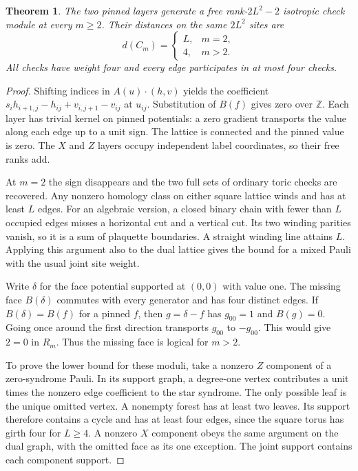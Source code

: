 \documentclass[11pt]{article}
\newtheorem{theorem}{Theorem}
\newcommand{\Z}{\mathbb Z}
\begin{document}
\begin{theorem}\label{thm:lattice}
The two pinned layers generate a free rank-$2L^2-2$ isotropic check module at every $m\ge2$. Their distances on the same $2L^2$ sites are
\[
 d(C_m)=
 \begin{cases}L,&m=2,\\4,&m>2.\end{cases}
\]
All checks have weight four and every edge participates in at most four checks.
\end{theorem}
\begin{proof}
Shifting indices in $A(u)\cdot(h,v)$ yields the coefficient
$s_i h_{i+1,j}-h_{ij}+v_{i,j+1}-v_{ij}$ at $u_{ij}$. Substitution of $B(f)$ gives zero over $\Z$. Each layer has trivial kernel on pinned potentials: a zero gradient transports the value along each edge up to a unit sign. The lattice is connected and the pinned value is zero. The $X$ and $Z$ layers occupy independent label coordinates, so their free ranks add.

At $m=2$ the sign disappears and the two full sets of ordinary toric checks are recovered. Any nonzero homology class on either square lattice winds and has at least $L$ edges. For an algebraic version, a closed binary chain with fewer than $L$ occupied edges misses a horizontal cut and a vertical cut. Its two winding parities vanish, so it is a sum of plaquette boundaries. A straight winding line attains $L$. Applying this argument also to the dual lattice gives the bound for a mixed Pauli with the usual joint site weight.

Write $\delta$ for the face potential supported at $(0,0)$ with value one. The missing face $B(\delta)$ commutes with every generator and has four distinct edges. If $B(\delta)=B(f)$ for a pinned $f$, then $g=\delta-f$ has $g_{00}=1$ and $B(g)=0$. Going once around the first direction transports $g_{00}$ to $-g_{00}$. This would give $2=0$ in $R_m$. Thus the missing face is logical for $m>2$.

To prove the lower bound for these moduli, take a nonzero $Z$ component of a zero-syndrome Pauli. In its support graph, a degree-one vertex contributes a unit times the nonzero edge coefficient to the star syndrome. The only possible leaf is the unique omitted vertex. A nonempty forest has at least two leaves. Its support therefore contains a cycle and has at least four edges, since the square torus has girth four for $L\ge4$. A nonzero $X$ component obeys the same argument on the dual graph, with the omitted face as its one exception. The joint support contains each component support.
\end{proof}
\end{document}
